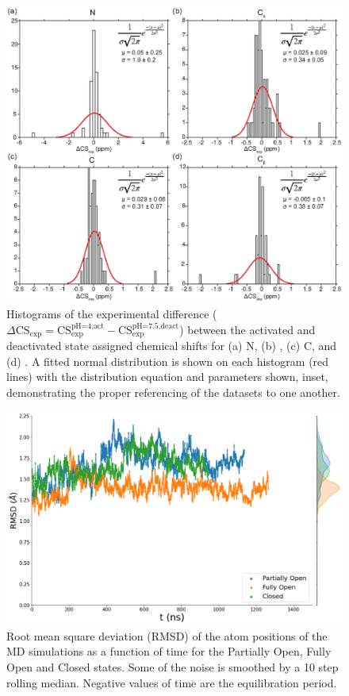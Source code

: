 \documentclass[%
 aip,
 amsmath,amssymb,
 preprint,%
]{revtex4-1}
\newcommand{\ca}{\ce{C_\alpha} }
\newcommand{\cb}{\ce{C_\beta} }
\begin{document}
\begin{figure}[tbp]
	\includegraphics[width=\textwidth]{figures_SI/exp_hist-05.eps}
	 \caption{\scriptsize
	 Histograms of the experimental difference ($\Delta\text{CS}_{\text{exp}} = \text{CS}_{\text{exp}}^{\text{pH=4,act}} - \text{CS}_{\text{exp}}^{\text{pH=7.5,deact}}$) between the activated and deactivated state assigned chemical shifts for (a) N, (b) \ca, (c) C, and (d) \cb. A fitted normal distribution is shown on each histogram (red lines) with the distribution equation and parameters shown, inset, demonstrating the proper referencing of the datasets to one another.
}
\label{SI_Exp_Hist}
\end{figure}


\begin{figure}[tbp]
	\includegraphics[width=\textwidth]{figures_SI/RMSD_print.png}
	 \caption{\scriptsize
	 Root mean square deviation (RMSD) of the \ca atom positions of the MD simulations as a function of time for the Partially Open, Fully Open and Closed states. Some of the noise is smoothed by a 10 step rolling median. Negative values of time are the equilibration period.
	 }
\label{SI_RMSD}
\end{figure} 
\end{document}
